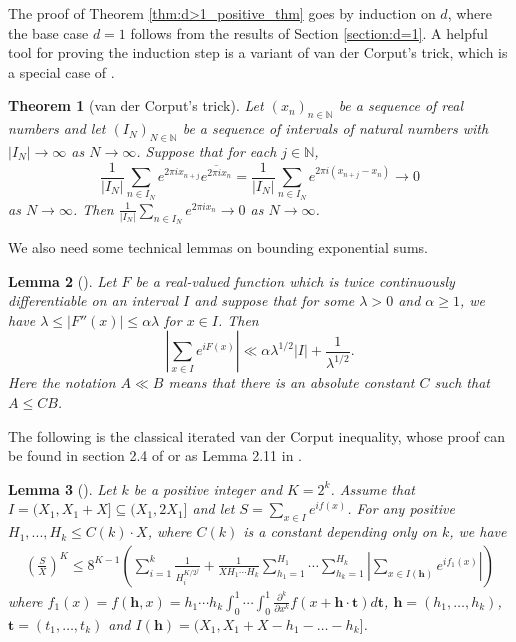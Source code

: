 \documentclass[12pt]{article}
\theoremstyle{plain} %
\newtheorem{theorem}{Theorem}[section]
\newtheorem{lemma}[theorem]{Lemma}
\theoremstyle{definition} %
\theoremstyle{plain}
\theoremstyle{plain}
\numberwithin{equation}{section}
\newcommand{\N}{\mathbb{N}}
\renewcommand{\leq}{\leqslant}
\renewcommand{\geq}{\geqslant}
\newcommand{\1}{\mathbbm{1}}
\newcommand{\oo}{\infty}
\begin{document}
The proof of Theorem \ref{thm:d>1_positive_thm} goes by induction on $d$, where the base case $d=1$ follows from the results of Section \ref{section:d=1}. A helpful tool for proving the induction step is a variant of van der Corput's trick, which is a special case of \cite[Theorem~2.12]{BM16}.
\begin{theorem}[van der Corput's trick]\label{thm:vdc_trick}
Let $(x_n)_{n\in \N}$ be a sequence of real numbers and let $(I_N)_{N\in \N}$ be a sequence of intervals of natural numbers with $|I_N|\to\oo$ as $N\to\oo$. Suppose that for each $j\in \N$, 
$$
\frac{1}{|I_N|}\sum_{n\in I_N}e^{2\pi i x_{n+j}}\overline{e^{2\pi ix_n} }=\frac{1}{|I_N|}\sum_{n\in I_N}e^{2\pi i (x_{n+j}-x_n)}\to 0
$$
as $N\to\oo$. Then $\frac{1}{|I_N|}\sum_{n\in I_N} e^{2\pi ix_n} \to 0$ as $N\to\oo$.
\end{theorem}

We also need some technical lemmas on bounding exponential sums.

\begin{lemma}[{\cite[Theorem 2.2]{van_der_corput_inequality_book}}]\label{lem:second_derivative_vdc_inequality}
    Let $F$ be a real-valued function which is twice continuously differentiable on an interval $I$ and suppose that for some $\lambda>0$ and $\alpha\geq 1$, we have $\lambda \leq |F''(x)|\leq \alpha \lambda $ for $x\in I$. Then
    \begin{equation}\label{eq:second_derivative_vdc_inequality}
    \left|\sum_{x\in I}e^{iF(x)}\right|\ll \alpha \lambda^{1/2}|I|+\frac{1}{\lambda^{1/2}}.
    \end{equation}
    Here the notation $A\ll B$ means that there is an absolute constant $C$ such that $A\leq CB$.
\end{lemma}

The following is the classical iterated van der Corput inequality, whose proof can be found in section 2.4 of \cite{van_der_corput_inequality_book} or as Lemma 2.11 in \cite{BKS19}.
\begin{lemma}[{\cite[Lemma 2.11]{BKS19}}]\label{lem:better_vdc}
    Let $k$ be a positive integer and $K=2^k$. Assume that $I=(X_1,X_1+X]\subseteq (X_1,2X_1]$ and let $S= \sum_{x\in I} e^{if(x)}$. For any positive $H_1,...,H_k\leq C(k)\cdot X$, where $C(k)$ is a constant depending only on $k$, we have 
    \begin{align}\label{eq:vdc_inequality}
\left(\frac{S}{X}\right)^K \leq 8^{K-1} \left(\sum_{i=1}^k\frac{1}{H_i^{K/2^j}}+\frac{1}{XH_1\cdots H_k}\sum_{h_1=1}^{H_1}\cdots \sum_{h_k=1}^{H_k}\left|\sum_{x\in I(\mathbf{h})}e^{if_1(x)}\right|\right)
    \end{align}
    where $f_1(x) =f(\mathbf{h},x)=h_1\cdots h_k \int_0^1\cdots \int_0^1 \frac{\partial^k}{\partial x^k }f(x+\mathbf{h}\cdot\mathbf{t})d\mathbf{t}$, $\mathbf{h}=(h_1,\dots,h_k)$, $\mathbf{t}=(t_1,\dots ,t_k)$ and $I(\mathbf{h})=(X_1,X_1+X-h_1-\dots-h_k]$.
\end{lemma}
\end{document}
